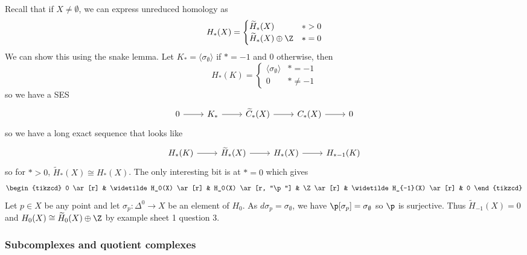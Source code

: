 \documentclass[a4paper]{article}
\renewcommand{\b}{\p}
\begin{document}
\begin{eg}
  Recall that if \(X \neq \emptyset\), we can express unreduced homology as
  \[
    H_*(X) =
    \begin{cases}
      \widetilde H_*(X) & * > 0 \\
      \widetilde H_*(X) \oplus \Z & * = 0
    \end{cases}
  \]
  We can show this using the snake lemma. Let \(K_* = \langle \sigma_\emptyset \rangle\) if \(* = -1\) and \(0\) otherwise, then
  \[
    H_*(K) =
    \begin{cases}
      \langle \sigma_\emptyset \rangle & * = -1 \\
      0 & * \neq -1
    \end{cases}
  \]
  so we have a SES
  \[
    \begin{tikzcd}
      0 \ar[r] & K_* \ar[r] & \widetilde C_*(X) \ar[r] & C_*(X) \ar[r] & 0
    \end{tikzcd}
  \]
  so we have a long exact sequence that looks like
  \[
    \begin{tikzcd}
      H_*(K) \ar[r] & \widetilde H_*(X) \ar[r] & H_*(X) \ar[r] & H_{* - 1}(K)
    \end{tikzcd}
  \]
  so for \(* > 0\), \(\tilde H_*(X) \cong H_*(X)\). The only interesting bit is at \(* = 0\) which gives
  \[
    \begin{tikzcd}
      0 \ar[r] & \widetilde H_0(X) \ar[r] & H_0(X) \ar[r, "\b"] & \Z \ar[r] & \widetilde H_{-1}(X) \ar[r] & 0
    \end{tikzcd}
  \]
  Let \(p \in X\) be any point and let \(\sigma_p: \Delta^0 \to X\) be an element of \(H_0\). As \(d \sigma_p = \sigma_\emptyset\), we have \(\b[\sigma_p] = \sigma_\emptyset\) so \(\b\) is surjective. Thus \(\widetilde H_{-1}(X) = 0\) and \(H_0(X) \cong \widetilde H_0(X) \oplus \Z\) by example sheet 1 question 3.
\end{eg}

\subsubsection{Subcomplexes and quotient complexes}
\end{document}
